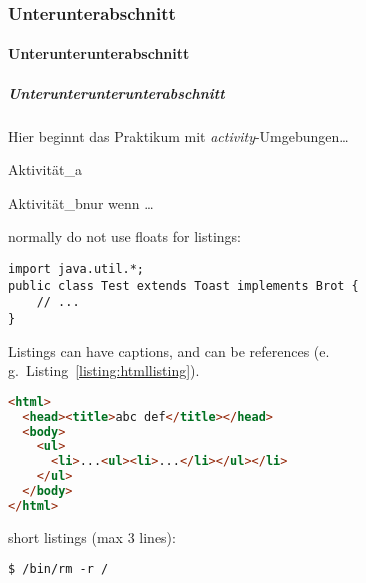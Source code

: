 \subsubsection{Unterunterabschnitt}
\lipsum[15]
\paragraph{Unterunterunterabschnitt}
\lipsum[16]
\subparagraph{Unterunterunterunterabschnitt}
\lipsum[17]

\varactivitiessection
Hier beginnt das Praktikum mit \textit{activity}-Umgebungen\dots

\lipsum[17]

\begin{activity}{Aktivität\_a}{}
    \lipsum[18-19]
\end{activity}

\begin{activity}{Aktivität\_b}{nur wenn \dots}
    \lipsum[20]
\end{activity}

normally do not use floats for listings:
\begin{lstlisting}
import java.util.*;
public class Test extends Toast implements Brot {
    // ...
}
\end{lstlisting}

Listings can have captions, and can be references (e.\,g.~Listing~\ref{listing:htmllisting}).
\begin{lstlisting}[language=HTML, caption={sourcecode in different languages possible, can have a caption}, label=listing:htmllisting]
<html>
  <head><title>abc def</title></head>
  <body>
    <ul>
      <li>...<ul><li>...</li></ul></li>
    </ul>
  </body>
</html>
\end{lstlisting}

short listings (max 3 lines):
\begin{lstlisting}[style=nonumbers]
$ /bin/rm -r /
\end{lstlisting}
